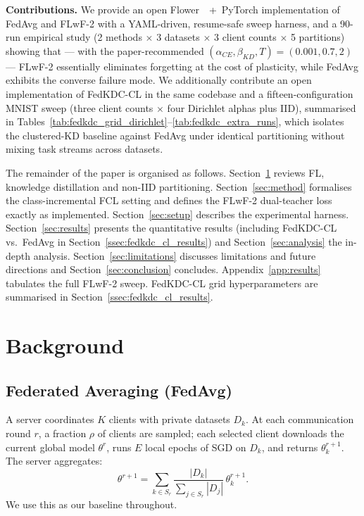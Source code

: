 \documentclass[journal]{IEEEtran}
\begin{document}
\textbf{Contributions.}
We provide an open Flower~\cite{flower}~+~PyTorch implementation of
FedAvg and FLwF-2 with a YAML-driven, resume-safe sweep harness, and
a 90-run empirical study (2 methods $\times$ 3 datasets $\times$ 3
client counts $\times$ 5 partitions) showing that --- with the
paper-recommended $(\alpha_{CE},\beta_{KD},T)=(0.001,0.7,2)$ ---
FLwF-2 essentially eliminates forgetting at the cost of plasticity,
while FedAvg exhibits the converse failure mode.
We additionally contribute an open implementation of FedKDC-CL in the
same codebase and a fifteen-configuration MNIST sweep (three client
counts $\times$ four Dirichlet alphas plus IID), summarised in
Tables~\ref{tab:fedkdc_grid_dirichlet}--\ref{tab:fedkdc_extra_runs},
which isolates the clustered-KD baseline against FedAvg under identical
partitioning without mixing task streams across datasets.

The remainder of the paper is organised as follows.
Section~\ref{sec:background} reviews FL, knowledge distillation and
non-IID partitioning. Section~\ref{sec:method} formalises the
class-incremental FCL setting and defines the FLwF-2 dual-teacher
loss exactly as implemented. Section~\ref{sec:setup} describes the
experimental harness. Section~\ref{sec:results} presents the
quantitative results (including FedKDC-CL vs.\ FedAvg in
Section~\ref{ssec:fedkdc_cl_results}) and Section~\ref{sec:analysis}
the in-depth analysis. Section~\ref{sec:limitations} discusses limitations and
future directions and Section~\ref{sec:conclusion} concludes.
Appendix~\ref{app:results} tabulates the full FLwF-2 sweep.
FedKDC-CL grid hyperparameters are summarised in Section~\ref{ssec:fedkdc_cl_results}.

\section{Background}
\label{sec:background}

\subsection{Federated Averaging (FedAvg)}

A server coordinates $K$ clients with private datasets $D_k$. At
each communication round $r$, a fraction $\rho$ of clients are
sampled; each selected client downloads the current global model
$\theta^{r}$, runs $E$ local epochs of SGD on $D_k$, and returns
$\theta_k^{r+1}$. The server aggregates:
\begin{equation}
    \theta^{r+1} = \sum_{k\in S_r} \frac{|D_k|}{\sum_{j\in S_r}|D_j|}\,
    \theta_k^{r+1}.
\end{equation}
We use this as our baseline throughout.
\end{document}

